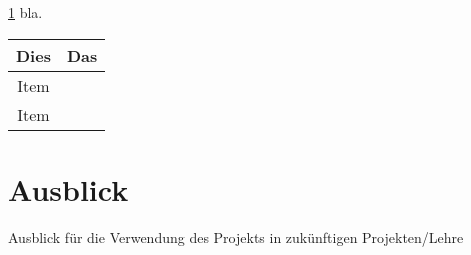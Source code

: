 \documentclass[12pt,a4paper,oneside,ngerman,draft=off,headings=small, fleqn]{scrreprt}
\newcommand{\cmark}{\ding{51}}%
\newcommand{\xmark}{\ding{53}}%
\begin{document}
	\cref{tab:test} bla.
	
	\begin{minipage}{\linewidth}
		\begin{table}[H]
			\centering
			\begin{tabular}{c|c}
				\hline
				\cellcolor{gray!40}\textbf{Dies} &\cellcolor{gray!40}\textbf{Das}\\
				\hline\hline
				Item & \xmark\\\hline
				Item & \cmark\\\hline
			\end{tabular}
			\label{tab:test}
		\end{table}
	\end{minipage}

	\lipsum[1]
	
	
	
	\chapter{Ausblick}\label{cha:ausb}
	\thispagestyle{scrheadings}
	
	Ausblick für die Verwendung des Projekts in zukünftigen Projekten/Lehre
	
\end{document}
